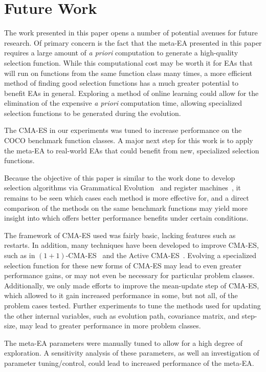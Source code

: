 \documentclass[sigconf]{acmart}
\begin{document}
\section{Future Work}
\label{Future Work}
The work presented in this paper opens a number of potential avenues for future research. Of primary concern is the fact that the meta-EA presented in this paper requires a large amount of \textit{a priori} computation to generate a high-quality selection function. While this computational cost may be worth it for EAs that will run on functions from the same function class many times, a more efficient method of finding good selection functions has a much greater potential to benefit EAs in general. Exploring a method of online learning could allow for the elimination of the expensive \textit{a priori} computation time, allowing specialized selection functions to be generated during the evolution.

The CMA-ES in our experiments was tuned to increase performance on the COCO benchmark function classes. A major next step for this work is to apply the meta-EA to real-world EAs that could benefit from new, specialized selection functions.

Because the objective of this paper is similar to the work done to develop selection algorithms via Grammatical Evolution~\citep{lourencco2013selection} and register machines~\citep{woodward2011selection}, it remains to be seen which cases each method is more effective for, and a direct comparison of the methods on the same benchmark functions may yield more insight into which offers better performance benefits under certain conditions.

The framework of CMA-ES used was fairly basic, lacking features such as restarts. In addition, many techniques have been developed to improve CMA-ES, such as in $(1+1)$-CMA-ES~\citep{igel2006cmaes1plus1} and the Active CMA-ES~\citep{jastrebski2006activecmaes}. Evolving a specialized selection function for these new forms of CMA-ES may lead to even greater performance gains, or may not even be necessary for particular problem classes. Additionally, we only made efforts to improve the mean-update step of CMA-ES, which allowed to it gain increased performance in some, but not all, of the problem cases tested. Further experiments to tune the methods used for updating the other internal variables, such as evolution path, covariance matrix, and step-size, may lead to greater performance in more problem classes.

The meta-EA parameters were manually tuned to allow for a high degree of exploration. A sensitivity analysis of these parameters, as well an investigation of parameter tuning/control, could lead to increased performance of the meta-EA.


 
\end{document}
